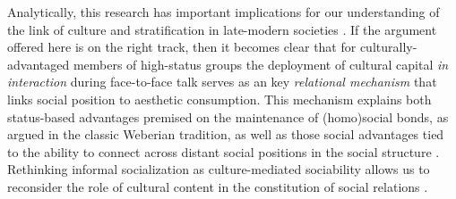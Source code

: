 Analytically, this research has important implications for our understanding of the link of culture and stratification in late-modern societies \citep{ollivier00}.  If the argument offered here is on the right track, then it becomes clear that for culturally-advantaged members of high-status groups the deployment of cultural capital \emph{in interaction} \citep{eliasoph_lichterman03} during face-to-face talk serves as an key \emph{relational mechanism} \citep{tilly98} that links social position to aesthetic consumption.  This mechanism explains both status-based advantages premised on the maintenance of (homo)social bonds, as argued in the classic Weberian tradition, as well as those social advantages tied to the ability to connect across distant social positions in the social structure \citep{erickson96, lizardo06a, lin99, pachuki_breiger10}.   Rethinking informal socialization as culture-mediated sociability allows us to reconsider the role of cultural content in the constitution of social relations \citep{ikegami05, mische03, mische10}.  
